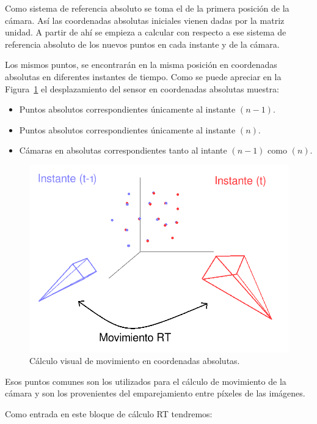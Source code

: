 Como sistema de referencia absoluto se toma el de la primera posición de la cámara. Así las coordenadas absolutas iniciales vienen dadas por la matriz unidad. A partir de ahí se empieza a calcular con respecto a ese sistema de referencia absoluto de los nuevos puntos en cada instante y de la cámara.

Los mismos puntos, se encontrarán en la misma posición en coordenadas absolutas en diferentes instantes de tiempo. Como se puede apreciar en la Figura~\ref{fig:movementRt} el desplazamiento del sensor en coordenadas absolutas muestra:

\begin{itemize}
\item Puntos absolutos correspondientes únicamente al instante $(n-1)$.
\item Puntos absolutos correspondientes únicamente al instante $(n)$.
\item Cámaras en absolutas correspondientes tanto al intante $(n-1)$ como $(n)$.
\end{itemize}

\begin{figure}[th]
\centering
\includegraphics[scale=0.4]{Figures/movement-rt.png}
\decoRule
\caption[Cálculo visual de movimiento en coordenadas absolutas]{Cálculo visual de movimiento en coordenadas absolutas.}
\label{fig:movementRt}
\end{figure}

Esos puntos comunes son los utilizados para el cálculo de movimiento de la cámara y son los provenientes del emparejamiento entre píxeles de las imágenes.

Como entrada en este bloque de cálculo RT tendremos:

